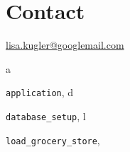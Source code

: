 \documentclass[letterpaper,10pt,english]{sphinxmanual}
\begin{document}
\chapter{Contact}
\label{index:contact}
\href{mailto:lisa.kugler@googlemail.com}{lisa.kugler@googlemail.com}


\renewcommand{\indexname}{Python Module Index}
\begin{theindex}
\def\bigletter#1{{\Large\sffamily#1}\nopagebreak\vspace{1mm}}
\bigletter{a}
\item {\texttt{application}}, \pageref{application:module-application}
\indexspace
\bigletter{d}
\item {\texttt{database\_setup}}, \pageref{database_setup:module-database_setup}
\indexspace
\bigletter{l}
\item {\texttt{load\_grocery\_store}}, \pageref{load_grocery_store:module-load_grocery_store}
\end{theindex}

\renewcommand{\indexname}{Index}
\printindex
\end{document}
